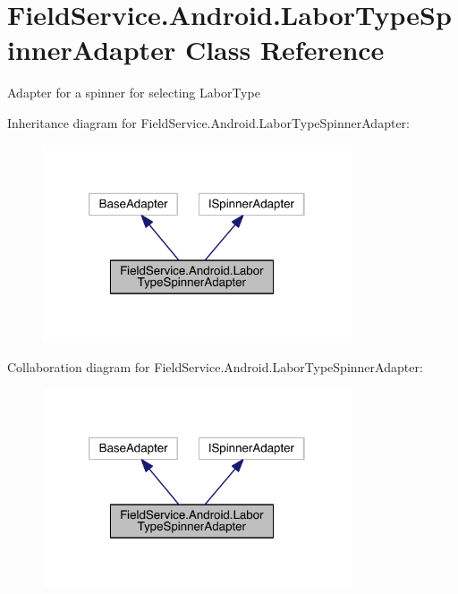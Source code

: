 \hypertarget{class_field_service_1_1_android_1_1_labor_type_spinner_adapter}{\section{Field\+Service.\+Android.\+Labor\+Type\+Spinner\+Adapter Class Reference}
\label{class_field_service_1_1_android_1_1_labor_type_spinner_adapter}
}


Adapter for a spinner for selecting Labor\+Type  




Inheritance diagram for Field\+Service.\+Android.\+Labor\+Type\+Spinner\+Adapter\+:
\nopagebreak
\begin{figure}[H]
\begin{center}
\leavevmode
\includegraphics[width=259pt]{class_field_service_1_1_android_1_1_labor_type_spinner_adapter__inherit__graph}
\end{center}
\end{figure}


Collaboration diagram for Field\+Service.\+Android.\+Labor\+Type\+Spinner\+Adapter\+:
\nopagebreak
\begin{figure}[H]
\begin{center}
\leavevmode
\includegraphics[width=259pt]{class_field_service_1_1_android_1_1_labor_type_spinner_adapter__coll__graph}
\end{center}
\end{figure}
